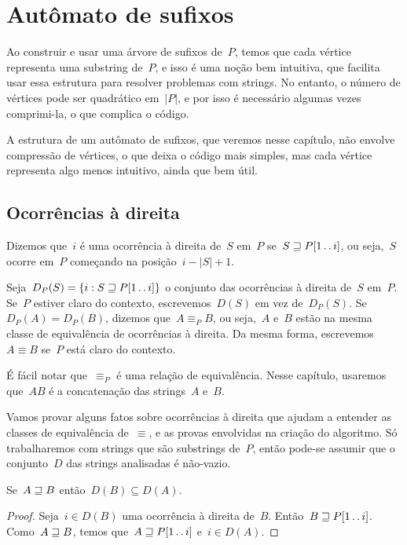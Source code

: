 \chapter{Autômato de sufixos} \label{chap:suffixautomaton}

Ao construir e usar uma árvore de sufixos de~$P$, temos que cada vértice representa uma substring de~$P$, e isso é uma noção bem intuitiva, que facilita usar essa estrutura para resolver problemas com strings. No entanto, o número de vértices pode ser quadrático em~$|P|$, e por isso é necessário algumas vezes comprimi-la, o que complica o código.

A estrutura de um autômato de sufixos, que veremos nesse capítulo, não envolve compressão de vértices, o que deixa o código mais simples, mas cada vértice representa algo menos intuitivo, ainda que bem útil.

\section{Ocorrências à direita}

Dizemos que~$i$ é uma ocorrência à direita de~$S$ em~$P$ se~$S \sqsupseteq P[1\,.\,.\, i]$, ou seja,~$S$ ocorre em~$P$ começando na posição~$i - |S| + 1$.

\begin{definition}
Seja~$D_P(S) = \{i : S \sqsupseteq P[1\,.\,.\, i] \}$ o conjunto das ocorrências à direita de~$S$ em~$P$. Se~$P$ estiver claro do contexto, escrevemos~$D(S)$ em vez de~$D_P(S)$. Se~${D_P(A) = D_P(B)}$, dizemos que~$A \equiv_P B$, ou seja,~$A$ e~$B$ estão na mesma classe de equivalência de ocorrências à direita. Da mesma forma, escrevemos~$A \equiv B$ se~$P$ está claro do contexto.
\end{definition}

É fácil notar que~$\equiv_P$ é uma relação de equivalência. Nesse capítulo, usaremos que~$AB$ é a concatenação das strings~$A$ e~$B$.

Vamos provar alguns fatos sobre ocorrências à direita que ajudam a entender as classes de equivalência de~$\equiv$, e as provas envolvidas na criação do algoritmo. Só trabalharemos com strings que são substrings de~$P$, então pode-se assumir que o conjunto~$D$ das strings analisadas é não-vazio.

\begin{lemma}
\label{lem:R1}
Se~$A \sqsupseteq B$ então~$D(B) \subseteq D(A)$.
\end{lemma}

\begin{proof}
Seja~$i \in D(B)$ uma ocorrência à direita de~$B$. Então~$B \sqsupseteq P[1\,.\,.\, i]$. Como~$A \sqsupseteq B$, temos que~$A \sqsupseteq P[1\,.\,.\, i]$ e~$i \in D(A)$.
\end{proof}

